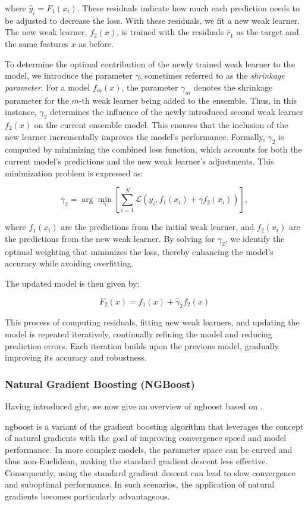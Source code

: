 where \(\hat{y}_{i} = F_{1}(x_{i})\). These residuals indicate how much each prediction needs to be adjusted to decrease the loss.
With these residuals, we fit a new weak learner.
The new weak learner, $f_{2}(x)$, is trained with the residuals $\hat{r}_{1}$ as the target and the same features $x$ as before.

To determine the optimal contribution of the newly trained weak learner to the model, we introduce the parameter $\gamma$, sometimes referred to as the \textit{shrinkage parameter}.
For a model $f_{m}(x)$, the parameter $\gamma_{m}$ denotes the shrinkage parameter for the $m$-th weak learner being added to the ensemble.
Thus, in this instance, $\gamma_{2}$ determines the influence of the newly introduced second weak learner $f_{2}(x)$ on the current ensemble model.
This ensures that the inclusion of the new learner incrementally improves the model's performance.
Formally, $\gamma_{2}$ is computed by minimizing the combined loss function, which accounts for both the current model's predictions and the new weak learner's adjustments.
This minimization problem is expressed as:

$$
\gamma_{2} = \arg\min_{\gamma} \left[ \sum_{i=1}^{N} \mathcal{L}(y_{i}, f_{1}(x_{i}) + \gamma f_{2}(x_{i})) \right],
$$

where $f_{1}(x_{i})$ are the predictions from the initial weak learner, and $f_{2}(x_{i})$ are the predictions from the new weak learner.
By solving for $\gamma_{2}$, we identify the optimal weighting that minimizes the loss, thereby enhancing the model's accuracy while avoiding overfitting.

The updated model is then given by:

$$
F_{2}(x) = f_{1}(x) + \hat{\gamma}_{2} f_{2}(x)
$$

This process of computing residuals, fitting new weak learners, and updating the model is repeated iteratively, continually refining the model and reducing prediction errors.
Each iteration builds upon the previous model, gradually improving its accuracy and robustness.

\subsubsection{Natural Gradient Boosting (NGBoost)}
Having introduced \gls{gbr}, we now give an overview of \gls{ngboost} based on \citet{duan_ngboost_2020}.

\gls{ngboost} is a variant of the gradient boosting algorithm that leverages the concept of natural gradients with the goal of improving convergence speed and model performance.
In more complex models, the parameter space can be curved and thus non-Euclidean, making the standard gradient descent less effective.
Consequently, using the standard gradient descent can lead to slow convergence and suboptimal performance.
In such scenarios, the application of natural gradients becomes particularly advantageous.

